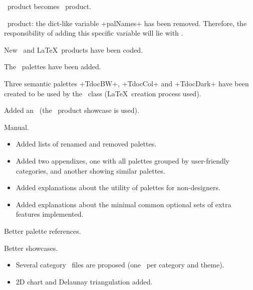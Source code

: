 \documentclass{tutodoc}
\begin{document}


\begin{tdocbreak}
    \item \LUADRAW\ product becomes \lua\ product.


    \item \lua\ product: the dict-like variable +palNames+ has been removed. Therefore, the responsibility of adding this specific variable will lie with \LUADRAW.
\end{tdocbreak}




\begin{tdocnew}
    \item New \css\ and \LaTeX\ products have been coded.


    \item The \palettable\ palettes have been added.


    \item Three semantic palettes +TdocBW+, +TdocCol+ and +TdocDark+ have been created to be used by the \tutodoc\ class (\LaTeX\ creation process used).


    \item Added an \thisdemo\ (the \css\ product showcase is used).
\end{tdocnew}




\begin{tdocupdate}
    \item Manual.
    \begin{itemize}
        \item Added lists of renamed and removed palettes.

        \item Added two appendixes, one with all palettes grouped by user-friendly categories, and another showing similar palettes.

        \item Added explanations about the utility of palettes for non-designers.

        \item Added explanations about the minimal common optional sets of extra features implemented.
    \end{itemize}


    \item Better palette references.

    \item Better showcases.
    \begin{itemize}
        \item Several category \pdf\ files are proposed (one \pdf\ per category and theme).

        \item 2D chart and Delaunay triangulation added.
    \end{itemize}
\end{tdocupdate}
\end{document}
